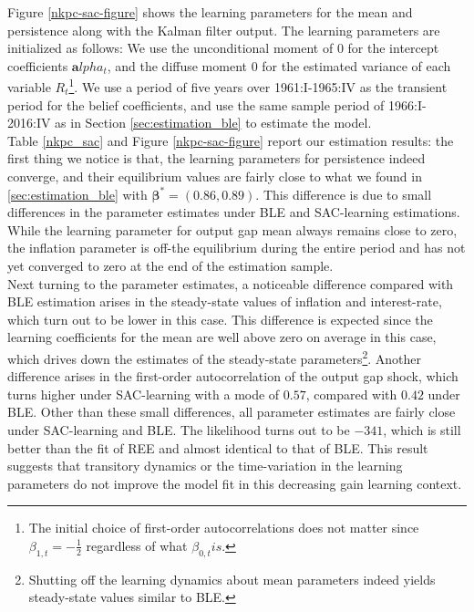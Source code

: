 Figure \ref{nkpc-sac-figure} shows the learning parameters for the mean and persistence along with the Kalman filter output. The learning parameters are initialized as follows: We use the unconditional moment of 0 for the intercept coefficients $\boldsymbol alpha_t$, and the diffuse moment 0 for the estimated variance of each variable $R_t$\footnote{The initial choice of first-order autocorrelations does not matter since $\beta_{1,t}=-\frac{1}{2}$ regardless of what $\beta_{0,t} is$.}. We use a period of five years over 1961:I-1965:IV as the transient period for the belief coefficients, and use the same sample period of 1966:I-2016:IV as in Section \ref{sec:estimation_ble} to estimate the model. \\
Table \ref{nkpc_sac} and Figure \ref{nkpc-sac-figure} report our estimation results: the first thing we notice is that, the learning parameters for persistence indeed converge, and their equilibrium values are fairly close to what we found in \ref{sec:estimation_ble} with $\boldsymbol \beta^{*}=(0.86, 0.89)$. This difference is due to small differences in the parameter estimates under BLE and SAC-learning estimations. While the learning parameter for output gap mean always remains close to zero, the inflation parameter is off-the equilibrium during the entire period and has not yet converged to zero at the end of the estimation sample. \\
\noindent
Next turning to the parameter estimates, a noticeable difference compared with BLE estimation arises in the steady-state values of inflation and interest-rate, which turn out to be lower in this case. This difference is expected since the learning coefficients for the mean are well above zero on average in this case, which drives down the estimates of the steady-state parameters\footnote{Shutting off the learning dynamics about mean parameters indeed yields steady-state values similar to BLE.}. Another difference arises in the first-order autocorrelation of the output gap shock, which turns higher under SAC-learning with a mode of $0.57$, compared with $0.42$ under BLE. Other than these small differences, all parameter estimates are fairly close under SAC-learning and BLE. The likelihood turns out to be $-341$, which is still better than the fit of REE and almost identical to that of BLE. This result suggests that transitory dynamics or the time-variation in the learning parameters do not improve the model fit in this decreasing gain learning context. 
